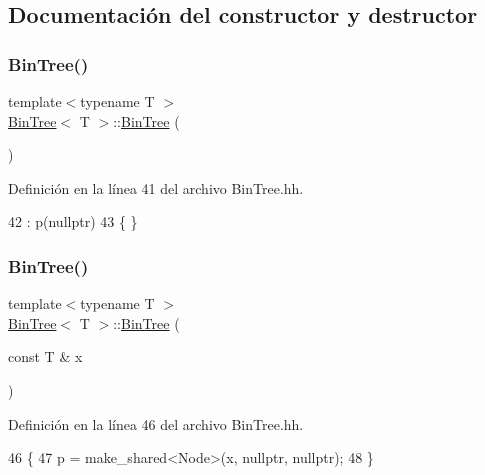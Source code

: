 \subsection{Documentación del constructor y destructor}
\mbox{\label{class_bin_tree_a47eef22d29cd023449d97c073c08e5b6}} 
\subsubsection{\texorpdfstring{Bin\+Tree()}{BinTree()}\hspace{0.1cm}{\footnotesize\ttfamily [1/3]}}
{\footnotesize\ttfamily template$<$typename T $>$ \\
\mbox{\hyperlink{class_bin_tree}{Bin\+Tree}}$<$ T $>$\+::\mbox{\hyperlink{class_bin_tree}{Bin\+Tree}} (\begin{DoxyParamCaption}{ }\end{DoxyParamCaption})}



Definición en la línea 41 del archivo Bin\+Tree.\+hh.


\begin{DoxyCode}
42     :   p(\textcolor{keyword}{nullptr})
43     \{   \}
\end{DoxyCode}
\mbox{\label{class_bin_tree_a1ab686e0bcf990093ff91fe71744c1a4}} 
\subsubsection{\texorpdfstring{Bin\+Tree()}{BinTree()}\hspace{0.1cm}{\footnotesize\ttfamily [2/3]}}
{\footnotesize\ttfamily template$<$typename T $>$ \\
\mbox{\hyperlink{class_bin_tree}{Bin\+Tree}}$<$ T $>$\+::\mbox{\hyperlink{class_bin_tree}{Bin\+Tree}} (\begin{DoxyParamCaption}\item[{const T \&}]{x }\end{DoxyParamCaption})}



Definición en la línea 46 del archivo Bin\+Tree.\+hh.


\begin{DoxyCode}
46                          \{
47         p = make\_shared<Node>(x, \textcolor{keyword}{nullptr}, \textcolor{keyword}{nullptr});
48     \}
\end{DoxyCode}
\mbox{\label{class_bin_tree_adb7eeff76d08130c943b36af215eb521}} 

